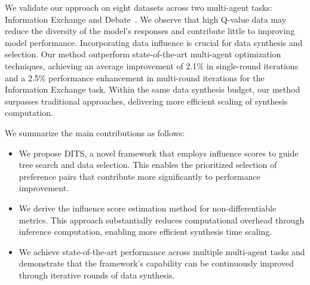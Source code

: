 We validate our approach on eight datasets across two multi-agent tasks: Information Exchange and Debate~\cite{DBLP:journals/corr/abs-2410-08115}. We observe that high Q-value data may reduce the diversity of the model's responses and contribute little to improving model performance. Incorporating data influence is crucial for data synthesis and selection. Our method outperform state-of-the-art multi-agent optimization techniques, achieving an average improvement of 2.1\% in single-round iterations and a 2.5\% performance enhancement in multi-round iterations for the Information Exchange task. Within the same data synthesis budget, our method surpasses traditional approaches, delivering more efficient scaling of synthesis computation.

We summarize the main contributions as follows: 
\begin{itemize}
    \item We propose DITS, a novel framework that employs influence scores to guide tree search and data selection. This enables the prioritized selection of preference pairs that contribute more significantly to performance improvement.
    
    \item We derive the influence score estimation method for non-differentiable metrics. This approach substantially reduces computational overhead through inference computation, enabling more efficient synthesis time scaling.
    \item We achieve state-of-the-art performance across multiple multi-agent tasks and demonstrate that the framework's capability can be continuously improved through iterative rounds of data synthesis.
\end{itemize}